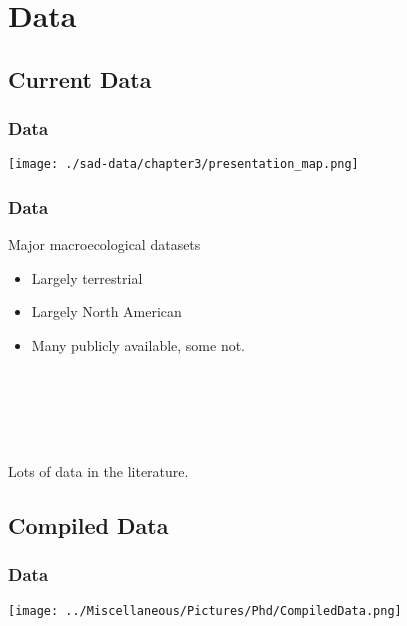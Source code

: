 \documentclass[14pt]{beamer}
\begin{document}
\section{Data}
\subsection{Current Data}
\begin{frame}[t]
\frametitle{Data}
\vspace{-7pt}
\texttt{[image: ./sad-data/chapter3/presentation\_map.png]}
\end{frame}

\begin{frame}[t]{}
\frametitle{Data}
\begin{large}
Major macroecological datasets\\
\end{large}
\begin{itemize}
\item Largely terrestrial
\item Largely North American
\item Many publicly available, some not.
\end{itemize}
~\\
~\\
~\\
~\\
\begin{large}
Lots of data in the literature.\\
\end{large}
\end{frame}


\subsection{Compiled Data}
\begin{frame}{}
\frametitle{Data}
\texttt{[image: ../Miscellaneous/Pictures/Phd/CompiledData.png]}
\end{frame}
\end{document}
